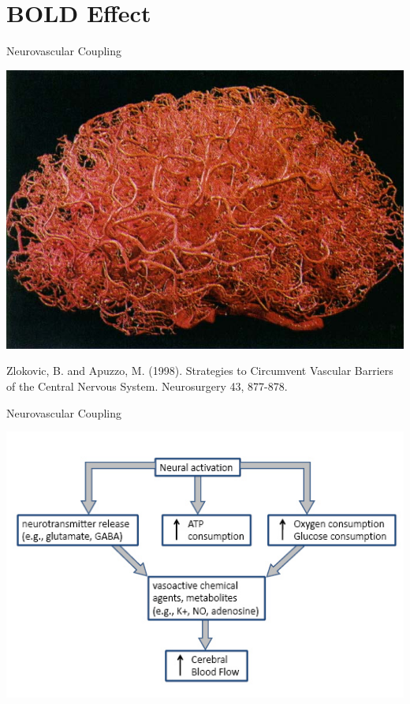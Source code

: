 \documentclass[aspectratio=169,xcolor=dvipsnames]{beamer}
\begin{document}
\section{BOLD Effect}

\begin{frame}{Neurovascular Coupling}

\includegraphics[width=.7\textwidth]{imgs/brainveins}

\tiny{Zlokovic, B. and Apuzzo, M. (1998). Strategies to Circumvent Vascular Barriers of the Central Nervous System. Neurosurgery 43, 877-878.}
\end{frame}


\begin{frame}{Neurovascular Coupling}

\includegraphics[width=.75\textwidth]{imgs/neurovasccoupling}

\end{frame}

\end{document}

